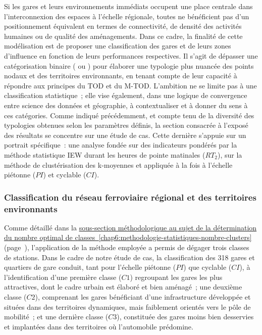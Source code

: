 \begin{refsegment}
Si les gares et leurs environnements immédiats occupent une place centrale dans l’interconnexion des espaces à l’échelle régionale, toutes ne bénéficient pas d’un positionnement équivalent en termes de connectivité, de densité des activités humaines ou de qualité des aménagements. Dans ce cadre, la finalité de cette modélisation est de proposer une classification des gares et de leurs zones d’influence en fonction de leurs performances respectives. Il s’agit de dépasser une catégorisation binaire ( ou ) pour élaborer une typologie plus nuancée des points nodaux et des territoires environnants, en tenant compte de leur capacité à répondre aux principes du \acrshort{TOD} et du \acrshort{M-TOD}. L’ambition ne se limite pas à une classification statistique~; elle vise également, dans une logique de convergence entre science des données et géographie, à contextualiser et à donner du sens à ces catégories. Comme indiqué précédemment, et compte tenu de la diversité des typologies obtenues selon les paramètres définis, la section consacrée à l’exposé des résultats se concentre sur une étude de cas. Cette dernière s’appuie sur un portrait spécifique~: une analyse fondée sur des indicateurs pondérés par la méthode statistique \acrshort{IEW} durant les heures de pointe matinales (\(RT_{2}\)), sur la méthode de clustérisation des k-moyennes et appliquée à la fois à l’échelle piétonne (\(PI\)) et cyclable (\(CI\)).%

\subsubsection*{Classification du réseau ferroviaire régional et des territoires environnants
    \label{chap6:results-classification-gares-classes}
    }

Comme détaillé dans la \hyperref[chap6:methodologie-statistiques-nombre-clusters]{sous-section méthodologique au sujet de la détermination du nombre optimal de classes~\ref{chap6:methodologie-statistiques-nombre-clusters}} (page~\pageref{chap6:methodologie-statistiques-nombre-clusters}), l’application de la méthode employée a permis de dégager trois classes de stations. Dans le cadre de notre étude de cas, la classification des 318 gares et quartiers de gare conduit, tant pour l’échelle piétonne (\(PI\)) que cyclable (\(CI\)), à l’identification d’une première classe (\(C1\)) regroupant les gares les plus attractives, dont le cadre urbain est élaboré et bien aménagé~; une deuxième classe (\(C2\)), comprenant les gares bénéficiant d'une infrastructure développée et situées dans des territoires dynamiques, mais faiblement orientés vers le pôle de mobilité~; et une dernière classe (\(C3\)), constituée des gares moins bien desservies et implantées dans des territoires où l’automobile prédomine.%


\end{refsegment}
